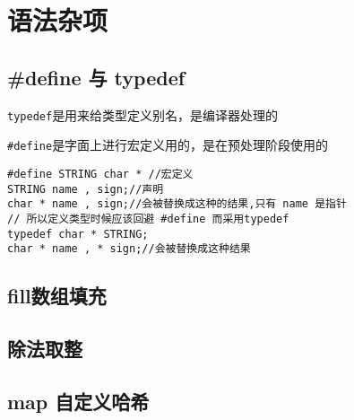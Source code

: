 \section{语法杂项}

\subsection{#define 与 typedef}
\verb|typedef|是用来给类型定义别名，是编译器处理的

\verb|#define|是字面上进行宏定义用的，是在预处理阶段使用的
\begin{lstlisting}
#define STRING char * //宏定义
STRING name , sign;//声明
char * name , sign;//会被替换成这种的结果,只有 name 是指针
// 所以定义类型时候应该回避 #define 而采用typedef
typedef char * STRING;
char * name , * sign;//会被替换成这种结果
\end{lstlisting}

\subsection{fill数组填充}


\subsection{除法取整}


\subsection{map 自定义哈希}
